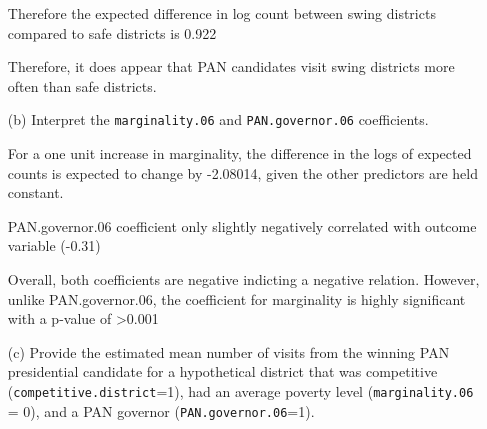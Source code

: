 \documentclass[12pt,letterpaper]{article}
\begin{document}
\begin{enumerate}
Therefore the expected difference in log count between swing districts compared to safe districts is 0.922

Therefore, it does appear that PAN candidates visit swing districts more often than safe districts. 	
	
	
	\item [(b)]
	Interpret the \texttt{marginality.06} and \texttt{PAN.governor.06} coefficients.

For a one  unit increase in marginality, the difference in the logs of expected counts is expected to change by -2.08014, given the other predictors are held constant.

PAN.governor.06 coefficient only slightly negatively correlated with outcome variable (-0.31) 

Overall, both coefficients are negative indicting a negative relation. 
However, unlike PAN.governor.06, the coefficient for marginality is highly significant with a p-value of >0.001

	\item [(c)]
	Provide the estimated mean number of visits from the winning PAN presidential candidate for a hypothetical district that was competitive (\texttt{competitive.district}=1), had an average poverty level (\texttt{marginality.06} = 0), and a PAN governor (\texttt{PAN.governor.06}=1).
	
	 

\end{enumerate}
\end{document}
